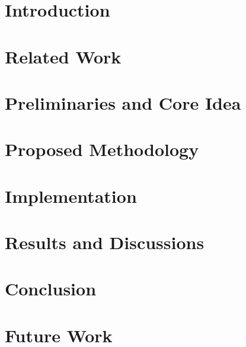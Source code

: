 \documentclass[english,10pt]{article}
\begin{document}

\setcounter{page}{2}
% 
% 

\newpage
\begin{singlespace}
\tableofcontents
\newpage
\listoffigures
\newpage

\section{Introduction}



\section{Related Work}

\section{Preliminaries and Core Idea}
%
%

\section{Proposed Methodology}

\section{Implementation}

\section{Results and Discussions}



\section{Conclusion}

\section{Future Work}


\vspace{2mm}


\end{singlespace}
\end{document}
